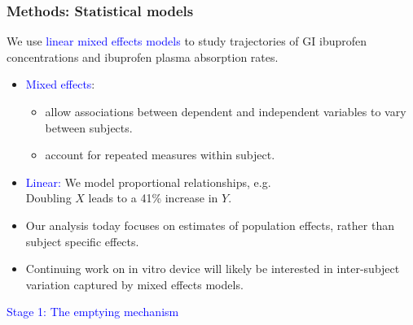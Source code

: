 \documentclass[handout]{beamer}
\begin{document}
\begin{frame}\frametitle{Methods: Statistical models}

\small
We use \textcolor{blue}{linear mixed effects models} to study trajectories of GI ibuprofen concentrations and ibuprofen plasma absorption rates.

\bigskip

\begin{itemize}
	\item \textcolor{blue}{Mixed effects}: 
	\begin{itemize}
		\item allow associations between dependent and independent variables to vary between subjects.
		\item account for repeated measures within subject.
	\end{itemize}
	\item \textcolor{blue}{Linear:}
	We model proportional relationships, e.g.\\
	\smallskip
	\footnotesize
	Doubling $X$ leads to a 41\% increase in $Y$.
	\small

\end{itemize}

\begin{itemize}
	\item Our analysis today focuses on estimates of population effects, rather than subject specific effects.
	\item Continuing work on in vitro device will likely be interested in inter-subject variation captured by mixed effects models.

\end{itemize}

\end{frame}

\begin{frame}

\LARGE
\begin{center}
\textcolor{blue}{Stage 1: The emptying mechanism}
\end{center}
\end{frame}
\end{document}

